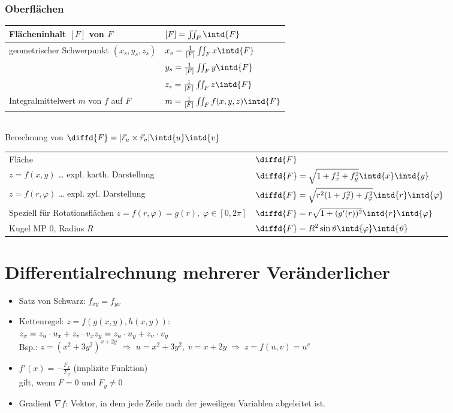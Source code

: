 \documentclass{scrreprt}
\begin{document}
\subsection{Oberflächen}
\begin{tabular}{L{0.5} | L{0.4}}
Flächeninhalt $[F]$ von $F$ & $[F]=\iint_F \intd{F}$\\
\hline
geometrischer Schwerpunkt $(x_s,y_s,z_s)$ & $x_s = \frac{1}{[F]}\iint_F x \intd{F}$\\&$y_s = \frac{1}{[F]}\iint_F y \intd{F}$\\&$z_s=\frac{1}{[F]}\iint_F z \intd{F}$\\
\hline
Integralmittelwert $m$ von $f$ auf $F$ & $m=\frac{1}{[F]}\iint_F f(x,y,z) \intd{F}$
\end{tabular}\\
Berechnung von $\diffd{F}=|\vec{r}_u\times \vec{r}_v| \intd{u}\intd{v}$\\
\begin{tabular}{L{0.5} | L{0.4}}
Fläche & $\diffd{F}$\\
$z=f(x,y)$ … expl. karth. Darstellung & $\diffd{F}=\sqrt{1+f_x^2+f_y^2}\intd{x}\intd{y}$\\
$z=f(r,\varphi)$ … expl. zyl. Darstellung & $\diffd{F}=\sqrt{r^2(1+f_r^2)+f_\varphi^2}\intd{r}\intd{\varphi}$\\
Speziell für Rotationsflächen $z=f(r,\varphi)=g(r), \; \varphi \in [0,2\pi]$ & $\diffd{F}=r\sqrt{1+(g'(r))^2}\intd{r}\intd{\varphi}$\\
Kugel MP $0$, Radius $R$ & $\diffd{F}=R^2\sin \vartheta \intd{\varphi}\intd{\vartheta}$
\end{tabular}

\chapter{Differentialrechnung mehrerer Veränderlicher}
\begin{itemize}
\item Satz von Schwarz: $f_{xy}=f_{yx}$
\item Kettenregel: $z=f(g(x,y), h(x,y))$:\\
$z_x=z_u\cdot u_x + z_v \cdot v_x\\
z_y=z_u \cdot u_y + z_v \cdot v_y$\\
Bsp.: $z=(x^2+3y^2)^{x+2y}$ $\Rightarrow$ $u=x^2+3y^2, \; v=x+2y \;\Rightarrow\; z=f(u,v)=u^v$
\item $f'(x)=-\frac{F_x}{F_y}$ (implizite Funktion)\\
gilt, wenn $F=0$ und $F_y\not = 0$
\item Gradient $\nabla f$: Vektor, in dem jede Zeile nach der jeweiligen Variablen abgeleitet ist.
\end{itemize}
\end{document}
